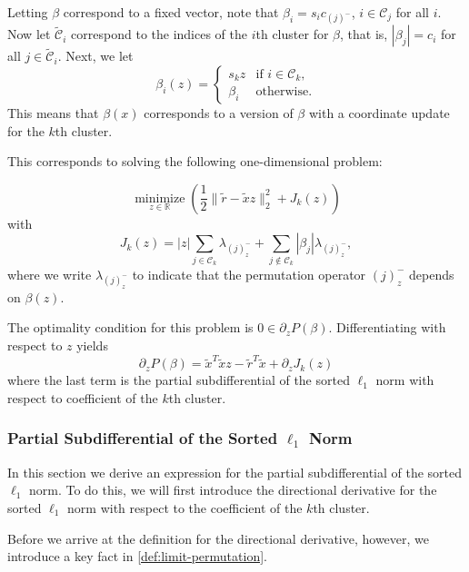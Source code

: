 Letting \(\beta\) correspond to a fixed vector, note that
\(\beta_i = s_i c_{(j)^-}\), \(i \in \mathcal{C}_j\) for all
\(i\). Now let \(\tilde{\mathcal{C}}_i\)
correspond to the indices of the \(i\)th cluster for \(\beta\), that is,
\(|\beta_j| = c_i\) for all \(j \in \tilde{\mathcal{C}}_i\).
Next, we let
\begin{equation}
  \label{eq:coordinate-update-beta}
  \beta_i(z) =
  \begin{cases}
    s_k z   & \text{if } i \in \mathcal{C}_k, \\
    \beta_i & \text{otherwise.}
  \end{cases}
\end{equation}
This means that \(\beta(x)\) corresponds to a version of \(\beta\) with a
coordinate update for the \(k\)th cluster.

This corresponds to solving the following
one-dimensional problem:

\begin{equation*}
  \operatorname*{minimize}_{z \in \mathbb{R}} \left( \frac{1}{2} \lVert \tilde r - \tilde x z \rVert_2^2 + J_k(z)\right)
\end{equation*}
with
\[
  J_k(z) = |z| \sum_{j \in \mathcal{C}_k} \lambda_{(j)^-_z}
  + \sum_{j \notin \mathcal{C}_k} |\beta_j| \lambda_{(j)^-_z},
\]
where we write \(\lambda_{(j)^-_z}\) to indicate that the permutation operator \((j)^-_z\)
depends on \(\beta(z)\).

The optimality condition for this problem is \(0 \in \partial_z P(\beta).\)
Differentiating with respect to \(z\) yields
\begin{equation}
  \label{eq:cluster-grad}
  \partial_{z} P(\beta) = \tilde x^T \tilde x z - \tilde r^T \tilde x + \partial_{z} J_k(z)
\end{equation}
where the last term is the partial subdifferential of the sorted \(\ell_1\)
norm with respect to coefficient of the \(k\)th cluster.

\subsubsection{Partial Subdifferential of the Sorted \(\ell_1\) Norm}

In this section we derive an expression for the partial subdifferential of the
sorted \(\ell_1\) norm. To do this, we will first introduce the directional
derivative for the sorted \(\ell_1\) norm with respect to the coefficient of
the \(k\)th cluster.

Before we arrive at the definition for the directional derivative, however,
we introduce a key fact in \cref{def:limit-permutation}.

